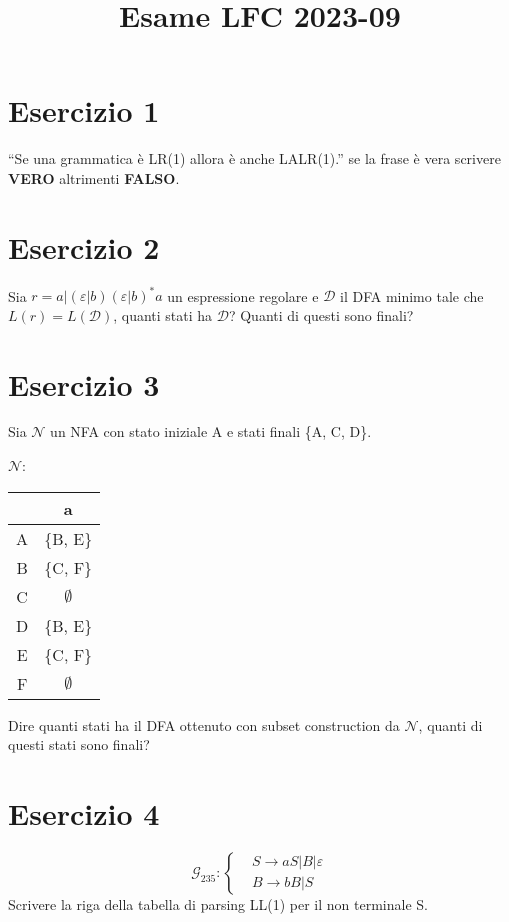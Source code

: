 \documentclass[a4paper]{article}
\title{Esame LFC 2023-09}
\date{}
\begin{document}
\maketitle

\section*{Esercizio 1}

``Se una grammatica è LR(1) allora è anche LALR(1).'' se la frase è vera scrivere \textbf{VERO} altrimenti \textbf{FALSO}.

\section*{Esercizio 2}

Sia $r = a | (\varepsilon | b)(\varepsilon | b)^{*}a$ un espressione regolare e $\mathcal{D}$ il DFA minimo tale che $L(r) = L(\mathcal{D})$, quanti stati ha $\mathcal{D}$? Quanti di questi sono finali?

\section*{Esercizio 3}

Sia $\mathcal{N}$ un NFA con stato iniziale A e stati finali \{A, C, D\}.
\begin{center}
  $\mathcal{N}$:
  \begin{tabular}{|c|c|}
    \hline
    & a\\
    \hline
    A & \{B, E\}\\
    \hline
    B & \{C, F\}\\
    \hline
    C & $\emptyset$\\
    \hline
    D & \{B, E\}\\
    \hline
    E & \{C, F\}\\
    \hline
    F & $\emptyset$\\
    \hline
  \end{tabular}
\end{center}
Dire quanti stati ha il DFA ottenuto con subset construction da $\mathcal{N}$, quanti di questi stati sono finali?

\section*{Esercizio 4}

\begin{equation*}
  \mathcal{G}_{235}:
  \begin{cases}
    &S \to aS | B | \varepsilon\\
    &B \to bB | S
  \end{cases}
\end{equation*}
Scrivere la riga della tabella di parsing LL(1) per il non terminale S.
\end{document}

